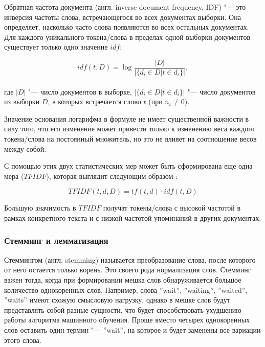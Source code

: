 \documentclass[bachelor, och, coursework]{SCWorks}
\begin{document}
            Обратная частота документа (англ. inverse document frequency, IDF)
            "--- это инверсия частоты слова, встречающегося во всех документах
            выборки. Она определяет, насколько часто слова появляются во всех
            остальных документах. Для каждого уникального токена/слова в
            пределах одной выборки документов существует только одно значение
            $idf$:

            \begin{equation}
                idf(t, D) = \log \frac{|D|}{|\{d_i \in D | t \in d_i \}|},
            \end{equation}
            \\
            где $|D|$ "--- число документов в выборке, $|\{d_i \in D | t \in d_i
            \}|$ "--- число документов из выборки $D$, в которых встречается
            слово $t$ (при $n_t \neq 0$).

            Значение основания логарифма в формуле не имеет существенной
            важности в силу того, что его изменение может привести только к
            изменению веса каждого токена/слова на постоянный множитель, но это
            не влияет на соотношение весов между собой.

            С помощью этих двух статистических мер может быть сформирована ещё
            одна мера ($TFIDF$), которая выглядит следующим образом
            \cite{tfidf}:

            \begin{equation}
                TFIDF(t, d, D) = tf(t,d) \cdot idf(t, D)
            \end{equation}

            Большую значимость в $TFIDF$ получат токены/слова с высокой частотой
            в рамках конкретного текста и с низкой частотой упоминаний в других
            документах. \cite{tf}

        \subsubsection{Стемминг и лемматизация}
            Стеммингом (англ. stemming) называется преобразование слова, после
            которого от него остается только корень. Это своего рода
            нормализация слов. Стемминг важен тогда, когда при формировании
            мешка слов обнаруживается большое количество однокоренных слов.
            Например, слова ''wait'', ''waiting'', ''waited'', ''waits'' имеют
            схожую смысловую нагрузку, однако в мешке слов будут представлять
            собой разные сущности, что будет способствовать ухудшению работы
            алгоритма машинного обучения. Проще вместо четырех однокоренных слов
            оставить один термин "--- ''wait'', на которое и будет заменены все
            вариации этого слова.
\end{document}
